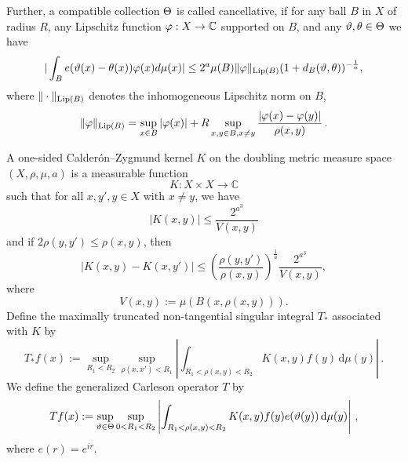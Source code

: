 Further, a compatible collection $\Theta$ is called cancellative, if
for any ball $B$ in $X$ of radius $R$, any Lipschitz function $\varphi: X\to \mathbb{C}$
supported on $B$, and any $\vartheta,\theta\in \Theta$ we have
\begin{equation}
    \label{eq vdc cond}
    |\int_B e(\vartheta(x)-{\theta(x)}) \varphi(x) d\mu(x)|\le 2^a  \mu(B)\|\varphi\|_{\operatorname{\operatorname{Lip}}(B)}
(1+d_B(\vartheta,\theta))^{-\frac{1}{a}},
\end{equation}
where $\|\cdot\|_{\operatorname{\operatorname{Lip}}(B)}$ denotes the inhomogeneous Lipschitz norm on $B$,
$$
    \|\varphi\|_{\operatorname{\operatorname{Lip}}(B)} = \sup_{x \in B} |\varphi(x)| + R \sup_{x,y \in B, x \neq y} \frac{|\varphi(x) - \varphi(y)|}{\rho(x,y)}\,.
$$




A one-sided Calder\'on--Zygmund kernel $K$ on  the doubling metric measure space $(X, \rho, \mu, a)$ is a measurable function
 \begin{equation}\label{eqkernel0}
K:X\times X\to \mathbb{C}
 \end{equation}
such that for all $x,y',y\in X$ with $x\neq y$, we have
\begin{equation}\label{eqkernel size}
    |K(x,y)| \leq \frac{2^{a^3}}{V(x,y)}
  \end{equation}
 and if $2\rho(y,y') \leq \rho(x,y)$, then
  \begin{equation}
  \label{eqkernel y smooth}
       |K(x,y) - K(x,y')| \leq \left(\frac{\rho(y,y')}{\rho(x,y)}\right)^{\frac{1}{a}}\frac{2^{a^3}}{V(x,y)},
\end{equation}
where  \[V(x,y):=\mu(B(x,\rho(x,y))).\]
Define the maximally truncated non-tangential singular integral $T_{*}$ associated with $K$ by
\begin{equation}
    \label{def tang unm op}
    T_{*}f(x):=\sup_{R_1 < R_2} \sup_{\rho(x,x')<R_1} \left|\int_{R_1< \rho(x,y) < R_2}  K(x,y) f(y)  \, \mathrm{d}\mu(y) \right|\,.
\end{equation}
We define the generalized Carleson operator $T$ by
 \begin{equation}
        \label{def main op}
        Tf(x):=\sup_{\vartheta\in\Theta} \sup_{0 < R_1 < R_2}\left| \int_{R_1 <  \rho(x,y) < R_2}  K(x,y) f(y) e(\vartheta(y)) \, \mathrm{d}\mu(y) \right|\, ,
\end{equation}
where $e(r)=e^{ir}$.

